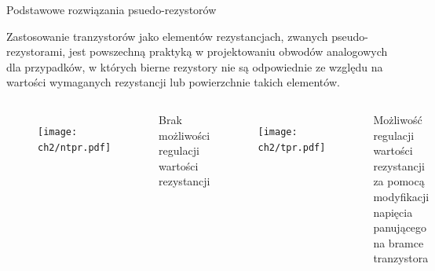 



\begin{frame}{Podstawowe rozwiązania psuedo-rezystorów}
    \vspace{-1em}
    \begin{block}{}
        Zastosowanie tranzystorów jako elementów rezystancjach, zwanych pseudo-rezystorami, jest powszechną praktyką w projektowaniu obwodów analogowych dla przypadków, w których bierne rezystory nie są odpowiednie ze względu na wartości wymaganych rezystancji lub powierzchnie takich elementów. 
       \end{block}
    \begin{columns}
        \vspace{-2em}
        \begin{figure}[H]
            \texttt{[image: ch2/ntpr.pdf]}
        \end{figure}
        \begin{alertblock}{}
            Brak możliwości regulacji wartości rezystancji
        \end{alertblock}

        \vspace{-1em}

        \begin{figure}[H]
            \texttt{[image: ch2/tpr.pdf]}
        \end{figure}
        \vspace{-1em}
        \begin{exampleblock}{}
            Możliwość regulacji wartości rezystancji za pomocą modyfikacji napięcia panującego na bramce tranzystora
        \end{exampleblock}

    \end{columns}
\end{frame}


        



